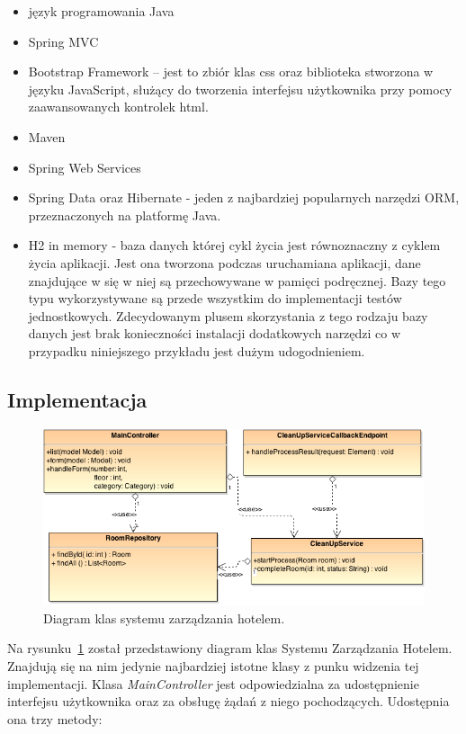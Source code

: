 \begin{itemize}
\item język programowania Java
\item Spring MVC
\item  Bootstrap Framework -- jest to zbiór  klas css oraz biblioteka stworzona w języku JavaScript, służący do tworzenia interfejsu użytkownika przy pomocy zaawansowanych kontrolek html.
\item Maven
\item Spring Web Services
\item Spring Data oraz Hibernate - jeden z najbardziej popularnych narzędzi ORM, przeznaczonych na platformę Java. 
\item H2 in memory - baza danych której cykl życia jest równoznaczny z cyklem życia aplikacji. Jest ona tworzona podczas uruchamiana aplikacji, dane znajdujące w się w niej są przechowywane w pamięci podręcznej. Bazy tego typu wykorzystywane są przede wszystkim do implementacji testów jednostkowych. Zdecydowanym plusem skorzystania z tego rodzaju bazy danych jest brak konieczności instalacji dodatkowych narzędzi co w przypadku niniejszego przykładu jest dużym udogodnieniem. 
\end{itemize}

\subsection{Implementacja}

\begin{figure}[h]
\centerline{\includegraphics[scale=0.6]{hotelManagementSystemClasses}}
\caption{Diagram klas systemu zarządzania hotelem.}
\label{fig:hotelManagementSystemClasses}
\end{figure}


Na rysunku~\ref{fig:hotelManagementSystemClasses} został przedstawiony diagram klas Systemu Zarządzania Hotelem. Znajdują się na nim jedynie najbardziej istotne klasy z punku widzenia tej implementacji. Klasa \textit{MainController} jest odpowiedzialna za udostępnienie interfejsu użytkownika oraz za obsługę żądań z niego pochodzących. Udostępnia ona trzy metody: 


